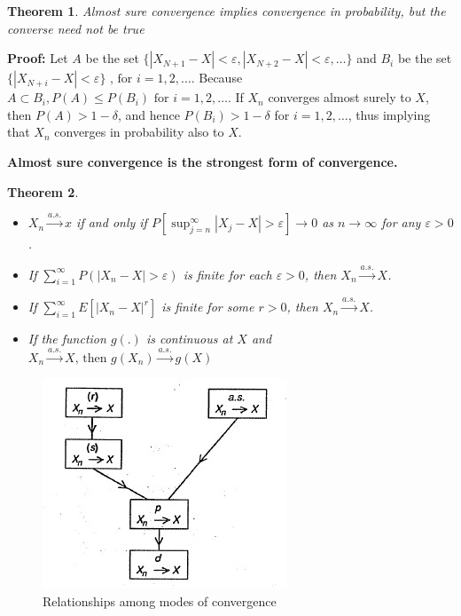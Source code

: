 \documentclass{article}
\newtheorem{theorem}{Theorem}[section]
\begin{document}
\begin{theorem}
    Almost sure convergence implies convergence in probability, but the converse need not be true
\end{theorem}

\textbf{Proof:} Let \(A\) be the set \(\{|X_{N+1}-X|<\varepsilon, |X_{N+2}-X|<\varepsilon, \dots \}\) and \(B_i\) be the set \(\{|X_{N+i}-X|<\varepsilon\} \text{ , for } i=1,2,\dots\). Because \(A \subset B_i, P(A) \leq P(B_i) \text{ for } i=1,2,\dots\). If \(X_n\) converges almost surely to $X$, then \(P(A)>1-\delta\), and hence \(P(B_i)>1-\delta\) for \(i=1,2,\dots\), thus implying that \(X_n\) converges in probability also to \(X\).

\textbf{Almost sure convergence is the strongest form of convergence.}

\begin{theorem}

    \begin{itemize}
        \item[(1)] \(X_n \stackrel{a.s.} \longrightarrow x\) if and only if \(P[\sup_{j=n}^{\infty} |X_j-X| > \varepsilon] \rightarrow 0\) as \(n \rightarrow \infty\) for any \(\varepsilon>0\).
        \item[(2)] If \(\sum_{i=1}^{\infty}P(|X_n-X|>\varepsilon)\) is finite for each \(\varepsilon>0\), then \(X_n \stackrel{a.s.} \longrightarrow X\).
        \item[(3)] If \(\sum_{i=1}^{\infty}E[|X_n-X|^r]\) is finite for some $r>0$, then \(X_n \stackrel{a.s.} \longrightarrow X\).
        \item[(4)] If the function \(g(.)\) is continuous at \(X\) and \(X_n \stackrel{a.s.} \longrightarrow X \text{, then } g(X_n) \stackrel{a.s.} \longrightarrow g(X) \)
    \end{itemize}
\end{theorem}

\begin{figure} [H]
    \centering
    \includegraphics{pics/modes of convergence.jpg}
    \caption{Relationships among modes of convergence}
    \label{fig:enter-label111}
\end{figure}
\end{document}
